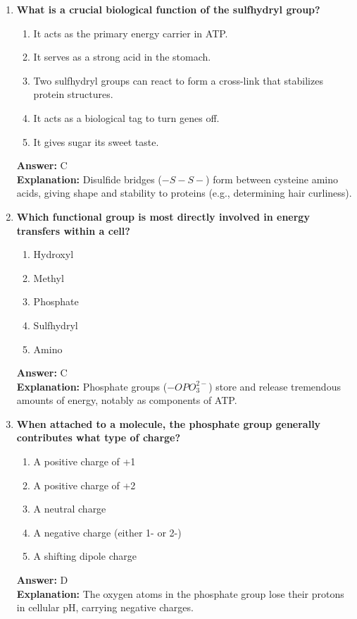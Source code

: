 \documentclass[11pt, a4paper]{article}
\begin{document}
\begin{enumerate}
\item \textbf{What is a crucial biological function of the sulfhydryl group?}
\begin{enumerate}[label=\Alph*.]
    \item It acts as the primary energy carrier in ATP.
    \item It serves as a strong acid in the stomach.
    \item Two sulfhydryl groups can react to form a cross-link that stabilizes protein structures.
    \item It acts as a biological tag to turn genes off.
    \item It gives sugar its sweet taste.
\end{enumerate}
\textbf{Answer:} C \\
\textbf{Explanation:} Disulfide bridges ($-S-S-$) form between cysteine amino acids, giving shape and stability to proteins (e.g., determining hair curliness).

\item \textbf{Which functional group is most directly involved in energy transfers within a cell?}
\begin{enumerate}[label=\Alph*.]
    \item Hydroxyl
    \item Methyl
    \item Phosphate
    \item Sulfhydryl
    \item Amino
\end{enumerate}
\textbf{Answer:} C \\
\textbf{Explanation:} Phosphate groups ($-OPO_3^{2-}$) store and release tremendous amounts of energy, notably as components of ATP.

\item \textbf{When attached to a molecule, the phosphate group generally contributes what type of charge?}
\begin{enumerate}[label=\Alph*.]
    \item A positive charge of +1
    \item A positive charge of +2
    \item A neutral charge
    \item A negative charge (either 1- or 2-)
    \item A shifting dipole charge
\end{enumerate}
\textbf{Answer:} D \\
\textbf{Explanation:} The oxygen atoms in the phosphate group lose their protons in cellular pH, carrying negative charges.


\end{enumerate}
\end{document}

